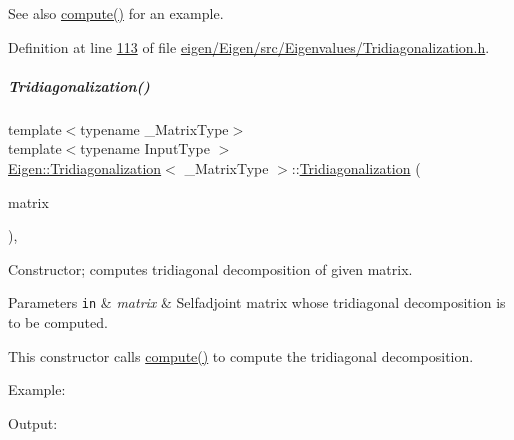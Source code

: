 \begin{DoxySeeAlso}{See also}
\hyperlink{group___eigenvalues___module_acd288abb081d3b40b87e4b98cd8f6ee9}{compute()} for an example. 
\end{DoxySeeAlso}


Definition at line \hyperlink{eigen_2_eigen_2src_2_eigenvalues_2_tridiagonalization_8h_source_l00113}{113} of file \hyperlink{eigen_2_eigen_2src_2_eigenvalues_2_tridiagonalization_8h_source}{eigen/\+Eigen/src/\+Eigenvalues/\+Tridiagonalization.\+h}.

\mbox{\label{group___eigenvalues___module_a05406b7df9a92fdcba72d31443f67a98}} 
\subparagraph{\texorpdfstring{Tridiagonalization()}{Tridiagonalization()}\hspace{0.1cm}{\footnotesize\ttfamily [2/4]}}
{\footnotesize\ttfamily template$<$typename \+\_\+\+Matrix\+Type$>$ \\
template$<$typename Input\+Type $>$ \\
\hyperlink{group___eigenvalues___module_class_eigen_1_1_tridiagonalization}{Eigen\+::\+Tridiagonalization}$<$ \+\_\+\+Matrix\+Type $>$\+::\hyperlink{group___eigenvalues___module_class_eigen_1_1_tridiagonalization}{Tridiagonalization} (\begin{DoxyParamCaption}\item[{const \hyperlink{group___core___module_struct_eigen_1_1_eigen_base}{Eigen\+Base}$<$ Input\+Type $>$ \&}]{matrix }\end{DoxyParamCaption})\hspace{0.3cm}{\ttfamily [inline]}, {\ttfamily [explicit]}}



Constructor; computes tridiagonal decomposition of given matrix. 


\begin{DoxyParams}[1]{Parameters}
\mbox{\tt in}  & {\em matrix} & Selfadjoint matrix whose tridiagonal decomposition is to be computed.\\
\hline
\end{DoxyParams}
This constructor calls \hyperlink{group___eigenvalues___module_acd288abb081d3b40b87e4b98cd8f6ee9}{compute()} to compute the tridiagonal decomposition.

Example\+: 
\begin{DoxyCodeInclude}
\end{DoxyCodeInclude}
 Output\+: 
\begin{DoxyVerbInclude}
\end{DoxyVerbInclude}
 

